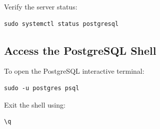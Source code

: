Verify the server status:

\begin{lstlisting}[basicstyle=\footnotesize\ttfamily]
sudo systemctl status postgresql
\end{lstlisting}

\subsection{Access the PostgreSQL Shell}
To open the PostgreSQL interactive terminal:

\begin{lstlisting}[basicstyle=\footnotesize\ttfamily]
sudo -u postgres psql
\end{lstlisting}

Exit the shell using:

\begin{lstlisting}[basicstyle=\footnotesize\ttfamily]
\q
\end{lstlisting}
